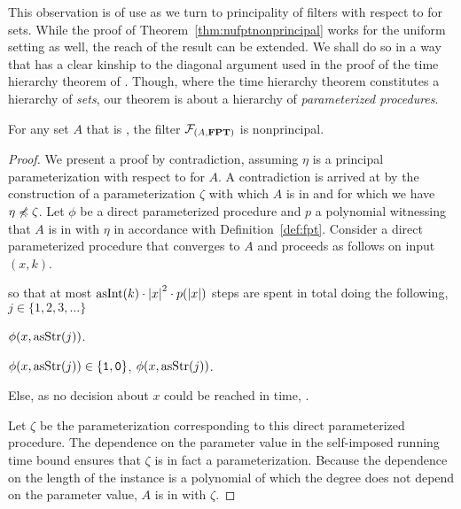 This observation is of use as we turn to principality of filters with respect to  for  sets.
While the proof of Theorem~\ref{thm:nufptnonprincipal} works for the uniform setting as well, the reach of the result can be extended.
We shall do so in a way that has a clear kinship to the diagonal argument used in the proof of the time hierarchy theorem of \textcite{hartmanis1965computational}.
Though, where the time hierarchy theorem constitutes a hierarchy of \emph{sets}, our theorem is about a hierarchy of \emph{parameterized procedures}.
\begin{theorem}
\label{thm:fptnonprincipal}
  For any set $A$ that is , the filter $\mathcal{F}_{(A, \textnormal{\textbf{FPT}})}$ is nonprincipal.
\end{theorem}
\begin{proof}
  We present a proof by contradiction, assuming $\eta$ is a principal parameterization with respect to  for $A$.
  A contradiction is arrived at by the construction of a parameterization $\zeta$ with which $A$ is in  and for which we have $\eta \not\preccurlyeq \zeta$.
  Let $\phi$ be a direct parameterized procedure and $p$ a polynomial witnessing that $A$ is in  with $\eta$ in accordance with Definition~\ref{def:fpt}.
  Consider a direct parameterized procedure that converges to $A$ and proceeds as follows on input $(x, k)$.
  \begin{codelisting}
  \item
     so that at most $\asNat(k) \cdot \length{x}^2 \cdot p(\length{x})$ steps are spent in total doing the following,  $j \in \{1, 2, 3, \ldots\}$
    \begin{codelisting}
    \item
       $\phi(x, \asStr(j))$.
    \item
       $\phi(x, \asStr(j)) \in \{\bits{1}, \bits{0}\}$,  $\phi(x, \asStr(j))$.
    \end{codelisting}
  \item
    Else, as no decision about $x$ could be reached in time,  .
  \end{codelisting}

  Let $\zeta$ be the parameterization corresponding to this direct parameterized procedure.
  The dependence on the parameter value in the self-imposed running time bound ensures that $\zeta$ is in fact a parameterization.
  Because the dependence on the length of the instance is a polynomial of which the degree does not depend on the parameter value, $A$ is in  with $\zeta$.


\end{proof}
